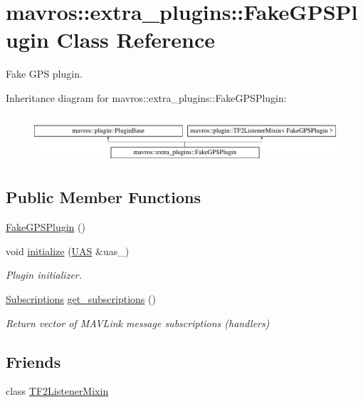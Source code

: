 \hypertarget{classmavros_1_1extra__plugins_1_1FakeGPSPlugin}{}\section{mavros\+::extra\+\_\+plugins\+::Fake\+G\+P\+S\+Plugin Class Reference}
\label{classmavros_1_1extra__plugins_1_1FakeGPSPlugin}


Fake G\+PS plugin.  


Inheritance diagram for mavros\+::extra\+\_\+plugins\+::Fake\+G\+P\+S\+Plugin\+:\begin{figure}[H]
\begin{center}
\leavevmode
\includegraphics[height=1.772152cm]{classmavros_1_1extra__plugins_1_1FakeGPSPlugin}
\end{center}
\end{figure}
\subsection*{Public Member Functions}
\begin{DoxyCompactItemize}
\item 
\mbox{\hyperlink{group__plugin_ga04d1196da53b8c99546ee75790a2d1ef}{Fake\+G\+P\+S\+Plugin}} ()
\item 
void \mbox{\hyperlink{group__plugin_gafcd498b4d7ddb485258eaade7b3aea3f}{initialize}} (\mbox{\hyperlink{classmavros_1_1UAS}{U\+AS}} \&uas\+\_\+)
\begin{DoxyCompactList}\small\item\em Plugin initializer. \end{DoxyCompactList}\item 
\mbox{\hyperlink{group__plugin_ga8967d61fc77040e0c3ea5a4585d62a09}{Subscriptions}} \mbox{\hyperlink{group__plugin_ga19cf673f75e3612d3e8d7b2cd316165e}{get\+\_\+subscriptions}} ()
\begin{DoxyCompactList}\small\item\em Return vector of M\+A\+V\+Link message subscriptions (handlers) \end{DoxyCompactList}\end{DoxyCompactItemize}
\subsection*{Friends}
\begin{DoxyCompactItemize}
\item 
class \mbox{\hyperlink{group__plugin_ga0eb3bbd8737231d2db969230d1d8b54b}{T\+F2\+Listener\+Mixin}}
\end{DoxyCompactItemize}
